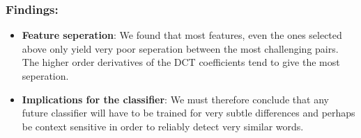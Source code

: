 \subsubsection{Findings:}

\begin{itemize}
    \item \textbf{Feature seperation}: We found that most features, even the ones selected above only yield very poor seperation between the most challenging pairs. The higher order derivatives of the DCT coefficients tend to give the most seperation.
    \item \textbf{Implications for the classifier}: We must therefore conclude that any future classifier will have to be trained for very subtle differences and perhaps be context sensitive in order to reliably detect very similar words.
\end{itemize}

